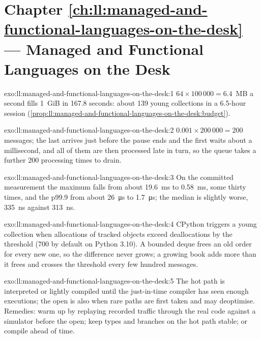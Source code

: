 \section*{Chapter \ref{ch:ll:managed-and-functional-languages-on-the-desk} --- Managed and Functional Languages on the Desk}

\begin{solution}{exo:ll:managed-and-functional-languages-on-the-desk:1}
$64 \times 100\,000 = 6.4$~MB a second fills 1~GiB in 167.8 seconds: about 139 young collections in a 6.5-hour session
(\cref{prop:ll:managed-and-functional-languages-on-the-desk:budget}).
\end{solution}

\begin{solution}{exo:ll:managed-and-functional-languages-on-the-desk:2}
$0.001 \times 200\,000 = 200$ messages; the last arrives just before the pause ends and the first waits about a millisecond,
and all of them are then processed late in turn, so the queue takes a further 200 processing times to drain.
\end{solution}

\begin{solution}{exo:ll:managed-and-functional-languages-on-the-desk:3}
On the committed measurement the maximum falls from about \qty{19.6}{\milli\second} to \qty{0.58}{\milli\second}, some
thirty times, and the p99.9 from about \qty{26}{\micro\second} to \qty{1.7}{\micro\second}; the median is slightly worse,
\qty{335}{\nano\second} against \qty{313}{\nano\second}.
\end{solution}

\begin{solution}{exo:ll:managed-and-functional-languages-on-the-desk:4}
CPython triggers a young collection when allocations of tracked objects exceed deallocations by the threshold (700 by
default on Python 3.10). A bounded deque frees an old order for every new one, so the difference never grows; a growing
book adds more than it frees and crosses the threshold every few hundred messages.
\end{solution}

\begin{solution}{exo:ll:managed-and-functional-languages-on-the-desk:5}
The hot path is interpreted or lightly compiled until the just-in-time compiler has seen enough executions; the open is
also when rare paths are first taken and may deoptimise. Remedies: warm up by replaying recorded traffic through the real
code against a simulator before the open; keep types and branches on the hot path stable; or compile ahead of time.
\end{solution}

